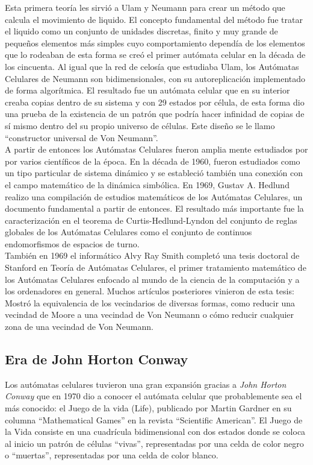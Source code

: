 Esta primera teoría les sirvió a Ulam y Neumann para crear un método que calcula el movimiento de liquido. El concepto fundamental del método fue tratar el liquido como un conjunto de unidades discretas, finito y muy grande de pequeños elementos más simples cuyo comportamiento dependía de los elementos que lo rodeaban de esta forma se creó el primer autómata celular en la década de los cincuenta. Al igual que la red de celosía que estudiaba Ulam, los Autómatas Celulares de Neumann son bidimensionales, con su autoreplicación implementado de forma algorítmica. El resultado fue un autómata celular que en su interior creaba copias dentro de su sistema y con 29 estados por célula, de esta forma dio una prueba de la existencia de un patrón que podría hacer infinidad de copias de sí mismo dentro del su propio universo de células. Este diseño se le llamo ``constructor universal de Von Neumann''.\\

A partir de entonces los Autómatas Celulares fueron amplia mente estudiados por por varios científicos de la época.
En la década de 1960, fueron estudiados como un tipo particular de sistema dinámico y se estableció también una conexión con el campo matemático de la dinámica simbólica. En 1969, Gustav A. Hedlund realizo una compilación de estudios matemáticos de los Autómatas Celulares, un documento fundamental a partir de entonces. El resultado más importante fue la caracterización en el teorema de Curtis-Hedlund-Lyndon del conjunto de reglas globales de los Autómatas Celulares como el conjunto de continuos endomorfismos de espacios de turno.\\

También en 1969 el informático Alvy Ray Smith\cite{alvy} completó una tesis doctoral de Stanford en Teoría de Autómatas Celulares, el primer tratamiento matemático de los Autómatas Celulares enfocado al mundo de la ciencia de la computación y a los ordenadores en general. Muchos artículos posteriores vinieron de esta tesis: Mostró la equivalencia de los vecindarios de diversas formas, como reducir una vecindad de Moore a una vecindad de Von Neumann o cómo reducir cualquier zona de una vecindad de Von Neumann.



\subsection{Era de John Horton Conway} %
Los autómatas celulares tuvieron una gran expansión gracias a \textit{John Horton Conway} que en 1970 dio a conocer el autómata celular que probablemente sea el más conocido: el Juego de la vida (Life), publicado por Martin Gardner en su columna ``Mathematical Games'' en la revista ``Scientific American''. El Juego de la Vida consiste en una cuadrícula bidimensional con dos estados donde se coloca al inicio un patrón de células ``vivas'', representadas por una celda de color negro o ``muertas'', representadas por una celda de color blanco. 


